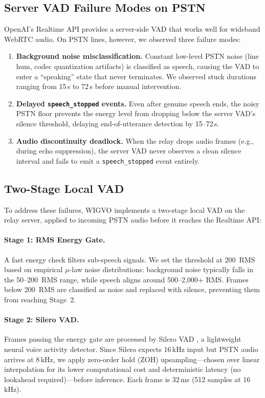 \documentclass[11pt]{article}
\begin{document}
\subsection{Server VAD Failure Modes on PSTN}

OpenAI's Realtime API provides a server-side VAD that works well for wideband WebRTC audio. On PSTN lines, however, we observed three failure modes:

\begin{enumerate}
    \item \textbf{Background noise misclassification.} Constant low-level PSTN noise (line hum, codec quantization artifacts) is classified as speech, causing the VAD to enter a ``speaking'' state that never terminates. We observed stuck durations ranging from 15\,s to 72\,s before manual intervention.
    \item \textbf{Delayed \texttt{speech\_stopped} events.} Even after genuine speech ends, the noisy PSTN floor prevents the energy level from dropping below the server VAD's silence threshold, delaying end-of-utterance detection by 15--72\,s.
    \item \textbf{Audio discontinuity deadlock.} When the relay drops audio frames (e.g., during echo suppression), the server VAD never observes a clean silence interval and fails to emit a \texttt{speech\_stopped} event entirely.
\end{enumerate}

\subsection{Two-Stage Local VAD}

To address these failures, WIGVO implements a two-stage local VAD on the relay server, applied to incoming PSTN audio before it reaches the Realtime API:

\paragraph{Stage 1: RMS Energy Gate.}
A fast energy check filters sub-speech signals. We set the threshold at 200~RMS based on empirical $\mu$-law noise distributions: background noise typically falls in the 50--200~RMS range, while speech aligns around 500--2{,}000+ RMS. Frames below 200~RMS are classified as noise and replaced with silence, preventing them from reaching Stage~2.

\paragraph{Stage 2: Silero VAD.}
Frames passing the energy gate are processed by Silero VAD \citep{silero_vad_2021}, a lightweight neural voice activity detector. Since Silero expects 16\,kHz input but PSTN audio arrives at 8\,kHz, we apply zero-order hold (ZOH) upsampling---chosen over linear interpolation for its lower computational cost and deterministic latency (no lookahead required)---before inference. Each frame is 32\,ms (512 samples at 16\,kHz).
\end{document}
